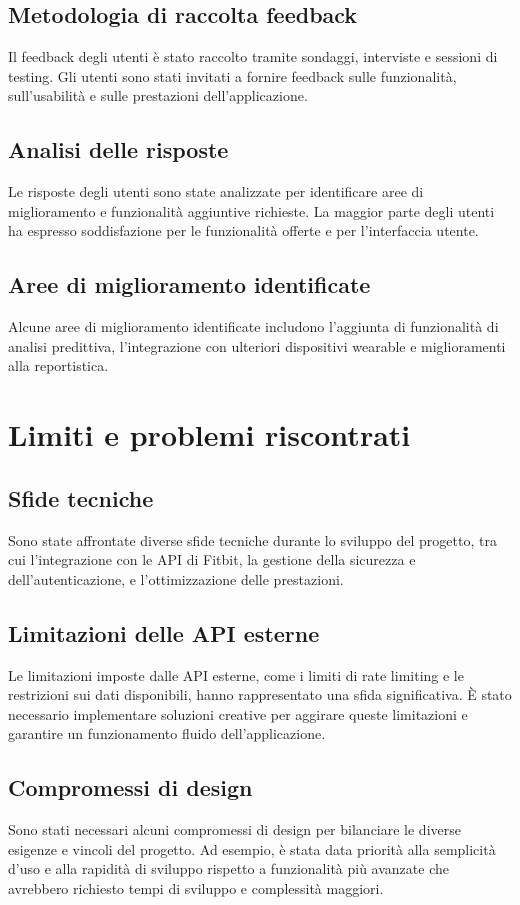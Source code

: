 \documentclass[12pt,a4paper,oneside]{report}
\begin{document}
\subsection{Metodologia di raccolta feedback}
Il feedback degli utenti è stato raccolto tramite sondaggi, interviste e sessioni di testing. Gli utenti sono stati invitati a fornire feedback sulle funzionalità, sull'usabilità e sulle prestazioni dell'applicazione.

\subsection{Analisi delle risposte}
Le risposte degli utenti sono state analizzate per identificare aree di miglioramento e funzionalità aggiuntive richieste. La maggior parte degli utenti ha espresso soddisfazione per le funzionalità offerte e per l'interfaccia utente.

\subsection{Aree di miglioramento identificate}
Alcune aree di miglioramento identificate includono l'aggiunta di funzionalità di analisi predittiva, l'integrazione con ulteriori dispositivi wearable e miglioramenti alla reportistica.

\section{Limiti e problemi riscontrati}
\subsection{Sfide tecniche}
Sono state affrontate diverse sfide tecniche durante lo sviluppo del progetto, tra cui l'integrazione con le API di Fitbit, la gestione della sicurezza e dell'autenticazione, e l'ottimizzazione delle prestazioni.

\subsection{Limitazioni delle API esterne}
Le limitazioni imposte dalle API esterne, come i limiti di rate limiting e le restrizioni sui dati disponibili, hanno rappresentato una sfida significativa. È stato necessario implementare soluzioni creative per aggirare queste limitazioni e garantire un funzionamento fluido dell'applicazione.

\subsection{Compromessi di design}
Sono stati necessari alcuni compromessi di design per bilanciare le diverse esigenze e vincoli del progetto. Ad esempio, è stata data priorità alla semplicità d'uso e alla rapidità di sviluppo rispetto a funzionalità più avanzate che avrebbero richiesto tempi di sviluppo e complessità maggiori.
\end{document}
